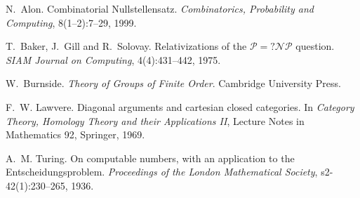 

N.~Alon.
\newblock Combinatorial Nullstellensatz.
\newblock \emph{Combinatorics, Probability and Computing}, 8(1--2):7--29, 1999.

T.~Baker, J.~Gill and R.~Solovay.
\newblock Relativizations of the $\mathcal{P} =? \mathcal{NP}$ question.
\newblock \emph{SIAM Journal on Computing}, 4(4):431--442, 1975.

W.~Burnside.
\newblock \emph{Theory of Groups of Finite Order}.
\newblock Cambridge University Press.

F.~W. Lawvere.
\newblock Diagonal arguments and cartesian closed categories.
\newblock In \emph{Category Theory, Homology Theory and their Applications II}, Lecture Notes in Mathematics 92, Springer, 1969.

A.~M. Turing.
\newblock On computable numbers, with an application to the Entscheidungsproblem.
\newblock \emph{Proceedings of the London Mathematical Society}, s2-42(1):230--265, 1936.

